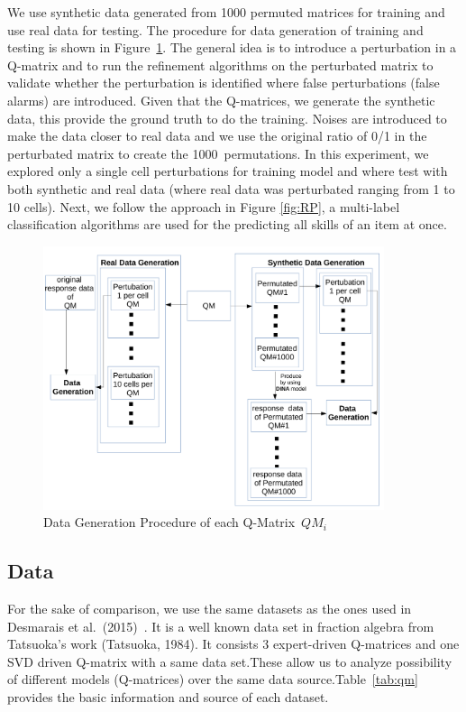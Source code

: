 \documentclass[12pt]{article}
\begin{document}
 We use synthetic data generated from 1000 permuted matrices for training  and use real data for testing. The procedure for data generation of training and testing is shown in Figure~\ref{fig:DG}. The general idea is to introduce a perturbation in a Q-matrix and to run the refinement algorithms on the perturbated matrix to validate whether the perturbation is identified where false perturbations (false alarms) are introduced. Given that the Q-matrices, we generate the synthetic data, this provide the ground truth to do the training.  Noises are introduced to make the data closer to real data and we use the original ratio of 0/1 in the perturbated matrix to create the 1000~permutations. In this experiment, we explored only a single cell perturbations for training model and where test with both synthetic and real data (where real data was perturbated ranging from 1 to 10 cells).
Next, we follow the approach in Figure \ref{fig:RP}, a multi-label classification algorithms are used for the predicting all skills of an item at once. 
\begin{figure}
  \centering
    \includegraphics[width=100mm ,scale=0.5]{graph/DG.pdf}
  \caption{Data Generation Procedure of each Q-Matrix~$QM_i$}  \label{fig:DG}
\end{figure}
 
\subsection{Data}
For the sake of comparison, we use the same datasets as the ones used in Desmarais et al.\ (2015)~\cite{tatsuoka1983rule,desmarais2015combining}. It is a well known data set in
fraction algebra from Tatsuoka's work (Tatsuoka, 1984)\cite{tatsuoka1983rule}. It consists 3 expert-driven Q-matrices and one SVD driven Q-matrix with a same data set.These allow us to analyze possibility of different models (Q-matrices) over the same data source.Table~\ref{tab:qm} provides the basic information and source of each dataset.   
\end{document}
